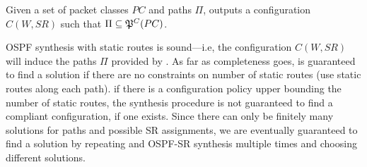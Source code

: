 \iffull
\begin{theorem} \label{thm:ospfsr}
	Given a set of packet classes $PC$ and paths $\Pi$,  outputs
	a configuration $C(W,SR)$ such that $\Pi\subseteq\mathfrak{P}^C(PC)$.
\end{theorem}

\fi

OSPF synthesis with static routes 
is sound---i.e, the configuration $C(W,SR)$ 
will induce the paths $\Pi$ provided by \genesis. As far as
completeness goes, \name is guaranteed to find a solution if
there are no constraints on number of static routes (use
static routes along each path). if there is a configuration policy 
upper bounding the number of static routes, the synthesis procedure 
is not guaranteed 
to find a compliant configuration, if one exists. 
Since there can only be finitely many 
solutions for paths and possible SR assignments, we are eventually guaranteed 
to find a solution by repeating \genesis and
OSPF-SR synthesis multiple times and choosing different
solutions.


